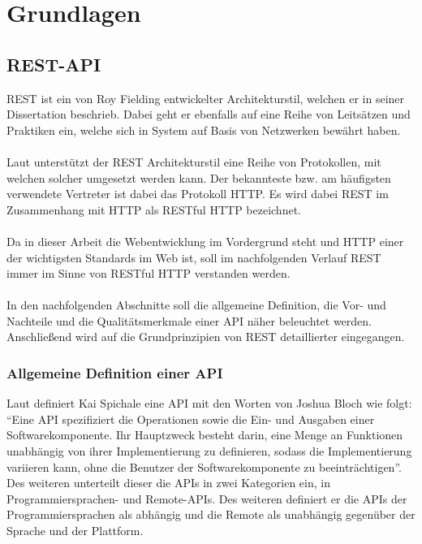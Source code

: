 
\chapter{Grundlagen}

\section{REST-API}
\gls{REST} ist ein von Roy Fielding entwickelter Architekturstil, welchen er in seiner Dissertation \cite{dissertationFielding} beschrieb. Dabei geht er ebenfalls auf eine Reihe von Leitsätzen und Praktiken ein, welche sich in System auf Basis von Netzwerken bewährt haben.\\
\\
Laut \cite[143]{apiDesign} unterstützt der REST Architekturstil eine Reihe von Protokollen, mit welchen solcher umgesetzt werden kann. Der bekannteste bzw. am häufigsten verwendete Vertreter ist dabei das Protokoll \gls{HTTP}. Es wird dabei \gls{REST} im Zusammenhang mit \gls{HTTP} als RESTful \gls{HTTP} bezeichnet. \\
\\
Da in dieser Arbeit die Webentwicklung im Vordergrund steht und \gls{HTTP} einer der wichtigsten Standards im Web ist, soll im nachfolgenden Verlauf \gls{REST} immer im Sinne von RESTful \gls{HTTP} verstanden werden.\\
\\
In den nachfolgenden Abschnitte soll die allgemeine Definition, die Vor- und Nachteile und die Qualitätsmerkmale einer \gls{API} näher beleuchtet werden. Anschließend wird auf die Grundprinzipien von \gls{REST} detaillierter eingegangen.

\subsection{Allgemeine Definition einer \gls{API}}\label{sec:defAPI}
Laut \cite[7]{apiDesign} definiert Kai Spichale eine \gls{API} mit den Worten von Joshua Bloch wie folgt: \enquote{Eine API spezifiziert die Operationen sowie die Ein- und Ausgaben einer Softwarekomponente. Ihr Hauptzweck besteht darin, eine Menge an Funktionen unabhängig von ihrer Implementierung zu definieren, sodass die Implementierung variieren kann, ohne die Benutzer der Softwarekomponente zu beeinträchtigen}. Des weiteren unterteilt dieser die \glspl{API} in zwei Kategorien ein, in Programmiersprachen- und Remote-\glspl{API}. Des weiteren definiert er die \glspl{API} der Programmiersprachen als abhängig und die Remote als unabhängig gegenüber der Sprache und der Plattform. \cite[7-8]{apiDesign} 

